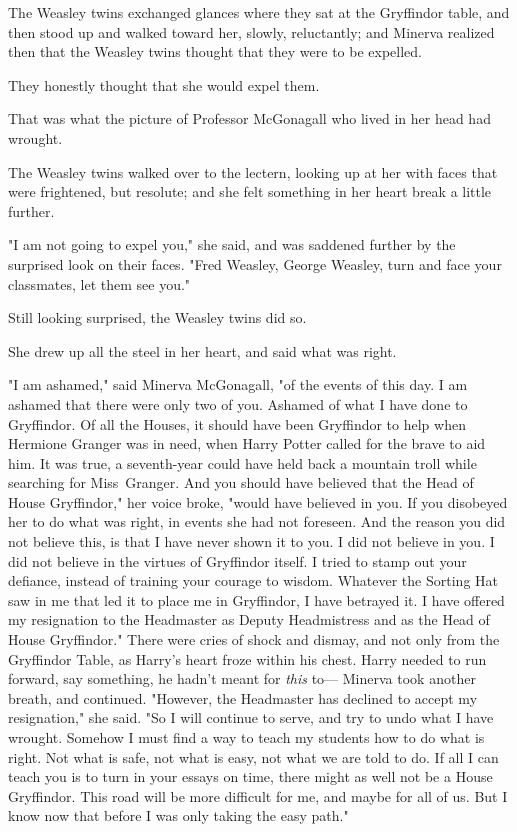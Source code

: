 The Weasley twins exchanged glances where they sat at the Gryffindor table, and
then stood up and walked toward her, slowly, reluctantly; and Minerva realized
then that the Weasley twins thought that they were to be expelled.

They honestly thought that she would expel them.

That was what the picture of Professor McGonagall who lived in her head had
wrought.

The Weasley twins walked over to the lectern, looking up at her with faces that
were frightened, but resolute; and she felt something in her heart break a
little further.

"I am not going to expel you," she said, and was saddened further by the
surprised look on their faces. "Fred Weasley, George Weasley, turn and face
your classmates, let them see you."

Still looking surprised, the Weasley twins did so.

She drew up all the steel in her heart, and said what was right.

"I am ashamed," said Minerva McGonagall, "of the events of this day. I am
ashamed that there were only two of you. Ashamed of what I have done to
Gryffindor. Of all the Houses, it should have been Gryffindor to help when
Hermione Granger was in need, when Harry Potter called for the brave to aid
him. It was true, a seventh-year could have held back a mountain troll while
searching for Miss~Granger. And you should have believed that the Head of House
Gryffindor," her voice broke, "would have believed in you. If you disobeyed her
to do what was right, in events she had not foreseen. And the reason you did
not believe this, is that I have never shown it to you. I did not believe in
you. I did not believe in the virtues of Gryffindor itself. I tried to stamp
out your defiance, instead of training your courage to wisdom. Whatever the
Sorting Hat saw in me that led it to place me in Gryffindor, I have betrayed
it. I have offered my resignation to the Headmaster as Deputy Headmistress and
as the Head of House Gryffindor."
\later
There were cries of shock and dismay, and not only from the Gryffindor Table,
as Harry's heart froze within his chest. Harry needed to run forward, say
something, he hadn't meant for \emph{this} to---
\later
Minerva took another breath, and continued. "However, the Headmaster has
declined to accept my resignation," she said. "So I will continue to serve, and
try to undo what I have wrought. Somehow I must find a way to teach my students
how to do what is right. Not what is safe, not what is easy, not what we are
told to do. If all I can teach you is to turn in your essays on time, there
might as well not be a House Gryffindor. This road will be more difficult for
me, and maybe for all of us. But I know now that before I was only taking the
easy path."

